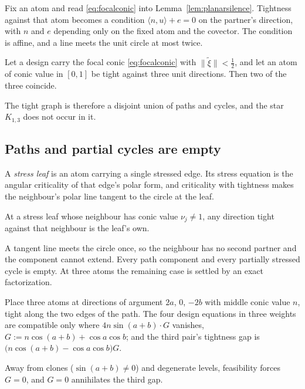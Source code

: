 Fix an atom and read \eqref{eq:focalconic} into
Lemma~\ref{lem:planarsilence}.  Tightness against that atom becomes a
condition $\langle n,u\rangle+e=0$ on the partner's direction, with $n$
and $e$ depending only on the fixed atom and the covector.  The condition
is affine, and a line meets the unit circle at most twice.

\begin{theorem}[Lean]\label{thm:degreetwo}
Let a design carry the focal conic \eqref{eq:focalconic} with
$\lVert\tilde\xi\rVert<\tfrac12$, and let an atom of conic value in
$[0,1]$ be tight against three unit directions.  Then two of the three
coincide.
\end{theorem}

The tight graph is therefore a disjoint union of paths and cycles, and the
star $K_{1,3}$ does not occur in it.

\subsection{Paths and partial cycles are empty}\label{app:paths}

A \emph{stress leaf} is an atom carrying a single stressed edge.  Its
stress equation is the angular criticality of that edge's polar form, and
criticality with tightness makes the neighbour's polar line tangent to the
circle at the leaf.

\begin{theorem}[Lean]\label{thm:leaftangency}
At a stress leaf whose neighbour has conic value $\nu_j\ne1$, any
direction tight against that neighbour is the leaf's own.
\end{theorem}

A tangent line meets the circle once, so the neighbour has no second
partner and the component cannot extend.  Every path component and every
partially stressed cycle is empty.  At three atoms the remaining case is
settled by an exact factorization.

\begin{proposition}[Lean]\label{prop:pthree}
Place three atoms at directions of argument $2a$, $0$, $-2b$ with middle
conic value $n$, tight along the two edges of the path.  The four design
equations in three weights are compatible only where
$4n\sin(a+b)\cdot G$ vanishes, $G:=n\cos(a+b)+\cos a\cos b$; and the third
pair's tightness gap is $\bigl(n\cos(a+b)-\cos a\cos b\bigr)G$.
\end{proposition}

Away from clones ($\sin(a+b)\ne0$) and degenerate levels, feasibility
forces $G=0$, and $G=0$ annihilates the third gap.

